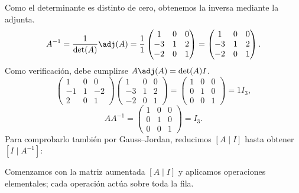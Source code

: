 Como el determinante es distinto de cero, obtenemos la inversa mediante la adjunta.
\[
A^{-1}=\frac1{\det(A)}\adj(A)=\frac1{1}\begin{pmatrix}1&0&0\\-3&1&2\\-2&0&1\end{pmatrix}=\begin{pmatrix}1&0&0\\-3&1&2\\-2&0&1\end{pmatrix}.
\]
Como verificación, debe cumplirse $A\adj(A)=\det(A)I$.
\[
\begin{pmatrix}1&0&0\\-1&1&-2\\2&0&1\end{pmatrix}\begin{pmatrix}1&0&0\\-3&1&2\\-2&0&1\end{pmatrix}=\begin{pmatrix}1&0&0\\0&1&0\\0&0&1\end{pmatrix}=1I_{3},
\]
\[
AA^{-1}=\begin{pmatrix}1&0&0\\0&1&0\\0&0&1\end{pmatrix}=I_{3}.
\]
Para comprobarlo también por Gauss--Jordan, reducimos $[A\mid I]$ hasta obtener $[I\mid A^{-1}]$:

Comenzamos con la matriz aumentada $[A\mid I]$ y aplicamos operaciones elementales; cada operación actúa sobre toda la fila.

